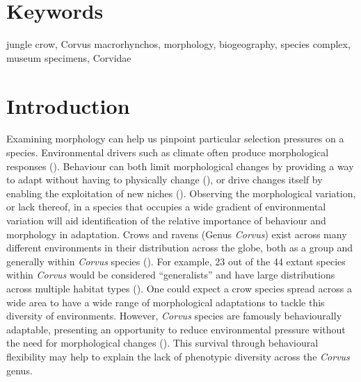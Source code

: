 \documentclass[10pt,a4paper]{article}
\begin{document}
\section*{Keywords}

jungle crow, Corvus macrorhynchos, morphology, biogeography, species complex, museum specimens, Corvidae

\clearpage
\pagestyle{fancy}

\section{Introduction}\label{introduction}

Examining morphology can help us pinpoint particular selection pressures on a species.
Environmental drivers such as climate often produce morphological responses ().
Behaviour can both limit morphological changes by providing a way to adapt without having to physically change (), or drive changes itself by enabling the exploitation of new niches ().
Observing the morphological variation, or lack thereof, in a species that occupies a wide gradient of environmental variation will aid identification of the relative importance of behaviour and morphology in adaptation.
Crows and ravens (Genus \emph{Corvus}) exist across many different environments in their distribution across the globe, both as a group and generally within \emph{Corvus} species ().
For example, 23 out of the 44 extant species within \emph{Corvus} would be considered ``generalists'' and have large distributions across multiple habitat types ().
One could expect a crow species spread across a wide area to have a wide range of morphological adaptations to tackle this diversity of environments.
However, \emph{Corvus} species are famously behaviourally adaptable, presenting an opportunity to reduce environmental pressure without the need for morphological changes ().
This survival through behavioural flexibility may help to explain the lack of phenotypic diversity across the \emph{Corvus} genus.
\end{document}
